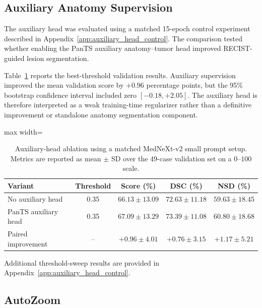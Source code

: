 \subsection{Auxiliary Anatomy Supervision}
\label{sec:auxiliary_head_ablation}

The auxiliary head was evaluated using a matched 15-epoch control experiment described in Appendix~\ref{app:auxiliary_head_control}. 
The comparison tested whether enabling the PanTS auxiliary anatomy--tumor head improved RECIST-guided lesion segmentation.

Table~\ref{tab:aux_head_ablation_main} reports the best-threshold validation results. 
Auxiliary supervision improved the mean validation score by \(+0.96\) percentage points, but the 95\% bootstrap confidence interval included zero \([-0.18,+2.05]\). 
The auxiliary head is therefore interpreted as a weak training-time regularizer rather than a definitive improvement or standalone anatomy segmentation component.

\begin{table}[htbp]
\centering
\caption{
Auxiliary-head ablation using a matched MedNeXt-v2 small prompt setup.
Metrics are reported as mean \(\pm\) SD over the 49-case validation set on a \(0\)--\(100\) scale.
}
\label{tab:aux_head_ablation_main}
\begin{adjustbox}{max width=\linewidth}
\begin{tabular}{lcccc}
\toprule
\textbf{Variant} & \textbf{Threshold} & \textbf{Score (\%)} & \textbf{DSC (\%)} & \textbf{NSD (\%)} \\
\midrule
No auxiliary head
& 0.35
& \(66.13 \pm 13.09\)
& \(72.63 \pm 11.18\)
& \(59.63 \pm 18.45\) \\
PanTS auxiliary head
& 0.35
& \(\mathbf{67.09 \pm 13.29}\)
& \(\mathbf{73.39 \pm 11.08}\)
& \(\mathbf{60.80 \pm 18.68}\) \\
\midrule
Paired improvement
& --
& \(+0.96 \pm 4.01\)
& \(+0.76 \pm 3.15\)
& \(+1.17 \pm 5.21\) \\
\bottomrule
\end{tabular}
\end{adjustbox}
\end{table}

Additional threshold-sweep results are provided in Appendix~\ref{app:auxiliary_head_control}.

\subsection{AutoZoom}
\label{sec:autozoom_ablation}

